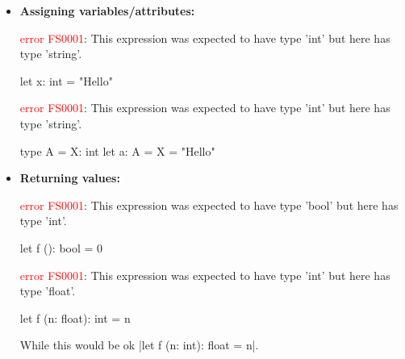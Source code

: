 \begin{itemize}[nosep]
    \item \textbf{Assigning variables/attributes:}
        \begin{fsharpcodeshort}{}{\ttfamily\raggedright\footnotesize
            \textcolor{red}{error FS0001}: This expression was expected to have type 'int' but here has type 'string'.%
        }
        let x: int = "Hello"
        \end{fsharpcodeshort}
        \begin{fsharpcodeshort}{}{\ttfamily\raggedright\footnotesize
            \textcolor{red}{error FS0001}: This expression was expected to have type 'int' but here has type 'string'.%
        }
        type A = {X: int}
        let a: A = {X = "Hello"}
        \end{fsharpcodeshort}
    \item \textbf{Returning values:}
        \begin{fsharpcodeshort}{}{\ttfamily\raggedright\footnotesize
            \textcolor{red}{error FS0001}: This expression was expected to have type 'bool' but here has type 'int'.%
        }
        let f (): bool = 0
        \end{fsharpcodeshort}
        \begin{fsharpcodeshort}{}{\ttfamily\raggedright\footnotesize
            \textcolor{red}{error FS0001}: This expression was expected to have type 'int' but here has type 'float'.%
        }
        let f (n: float): int = n
        \end{fsharpcodeshort}
        While this would be ok \fsharp|let f (n: int): float = n|.

\end{itemize}
